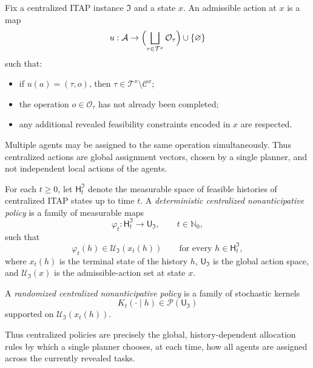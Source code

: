 \begin{definition}
Fix a centralized ITAP instance \(\mathfrak I\) and a state \(x\). An admissible action at \(x\) is a map
\[
u:\mathcal A\to \Bigl(\bigsqcup_{\tau\in\mathcal T^x}\mathcal O_\tau\Bigr)\cup\{\varnothing\}
\]
such that:
\begin{itemize}
    \item if \(u(a)=(\tau,o)\), then \(\tau\in\mathcal T^x\setminus\mathcal C^x\);
    \item the operation \(o\in\mathcal O_\tau\) has not already been completed;
    \item any additional revealed feasibility constraints encoded in \(x\) are respected.
\end{itemize}

Multiple agents may be assigned to the same operation simultaneously. Thus centralized actions are global assignment vectors, chosen by a single planner, and not independent local actions of the agents.
\end{definition}

\begin{definition}
For each \(t\ge 0\), let \(\mathsf H_t^{\mathfrak I}\) denote the measurable space of feasible histories of centralized ITAP states up to time \(t\). A \emph{deterministic centralized nonanticipative policy} is a family of measurable maps
\[
\varphi_t:\mathsf H_t^{\mathfrak I}\to \mathsf U_{\mathfrak I},\qquad t\in\mathbb N_0,
\]
such that
\[
\varphi_t(h)\in \mathcal U_{\mathfrak I}(x_t(h))
\qquad\text{for every }h\in \mathsf H_t^{\mathfrak I},
\]
where \(x_t(h)\) is the terminal state of the history \(h\), \(\mathsf U_{\mathfrak I}\) is the global action space, and \(\mathcal U_{\mathfrak I}(x)\) is the admissible-action set at state \(x\).

A \emph{randomized centralized nonanticipative policy} is a family of stochastic kernels
\[
K_t(\cdot\mid h)\in\mathcal P(\mathsf U_{\mathfrak I})
\]
supported on \(\mathcal U_{\mathfrak I}(x_t(h))\).

Thus centralized policies are precisely the global, history-dependent allocation rules by which a single planner chooses, at each time, how all agents are assigned across the currently revealed tasks.
\end{definition}

